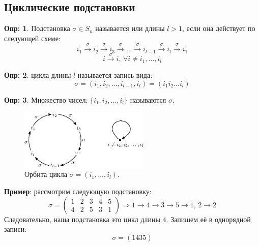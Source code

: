 \documentclass[12pt]{article}
\theoremstyle{definition}
\newtheorem{defn}{Опр:}
\begin{document}
\subsection*{Циклические подстановки}
\begin{defn}
	Подстановка $\sigma \in S_n$ называется  или  длины $l > 1$, если она действует по следующей схеме:
	$$
		i_1 \xrightarrow{\sigma} i_2 \xrightarrow{\sigma} i_3 \xrightarrow{\sigma} \dotsc \xrightarrow{\sigma} i_{l-1} \xrightarrow{\sigma} i_{l} \xrightarrow{\sigma} i_1
	$$
	$$
		i \xrightarrow{\sigma} i, \, \forall i \neq i_1, \dotsc, i_l
	$$
\end{defn}
\begin{defn}
	 цикла длины $l$ называется запись вида:
	$$
		\sigma =(i_1,i_2,\dotsc, i_{l-1}, i_l) =(i_1 i_2 \dotsc i_l)
	$$
\end{defn}
\begin{defn}
	Множество чисел: $\{i_1, i_2, \dotsc, i_l\}$ называются  $\sigma$.
\end{defn}
\begin{figure}[H]
	\centering
	\includegraphics[width=0.55\textwidth]{AL1L7_1.eps}
	\caption{Орбита цикла $\sigma = (i_1,\dotsc,i_l)$.}
	\label{7_1}
\end{figure}
\textbf{Пример}: рассмотрим следующую подстановку:
$$
	\sigma = 
	\begin{pmatrix}
		1 & 2 & 3 & 4 & 5 \\
		4 & 2 & 5 & 3 & 1
	\end{pmatrix} \Rightarrow 1 \to 4 \to 3 \to 5 \to 1, \, 2 \to 2
$$
Следовательно, наша подстановка это цикл длины $4$. Запишем её в однорядной записи:
$$
	\sigma = (1435)
$$
\end{document}
